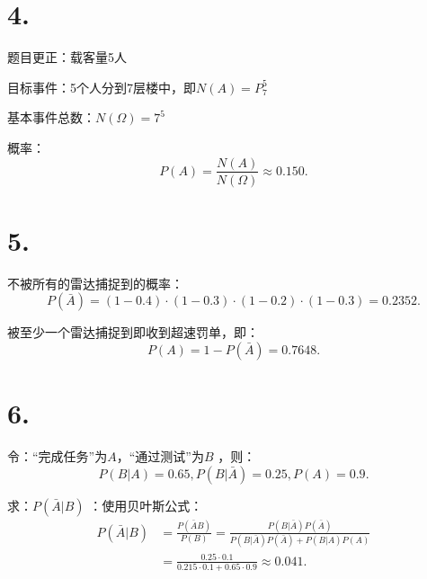 \section*{4. }%
\label{sec:4. }
题目更正：载客量5人

目标事件：5个人分到7层楼中，即$N\left( A \right) =P_{7}^{5}$

基本事件总数：$N\left( \Omega \right) =7^5$

概率： \[
    P\left( A \right) =\frac{N\left( A \right) }{N\left( \Omega \right) }\approx 0.150
.\] 

\section*{5. }%
\label{sec:5. }
不被所有的雷达捕捉到的概率：
\[
    P\left( \bar{A} \right) =\left( 1-0.4 \right) \cdot \left( 1-0.3 \right) \cdot \left( 1-0.2 \right) \cdot \left( 1-0.3 \right) =0.2352
.\] 

被至少一个雷达捕捉到即收到超速罚单，即：
\[
    P\left( A \right) =1-P\left( \bar{A} \right) =0.7648
.\] 
\section*{6. }%
\label{sec:6. }
令：“完成任务”为$A$，“通过测试”为$B$ ，则：\[
    P\left( B|A \right) =0.65,P\left( B|\bar{A} \right) =0.25,P\left( A \right) =0.9
.\] 

求：$P\left( \bar{A}|B \right) $ ：使用贝叶斯公式：
\begin{align*}
    P\left( \bar{A}|B \right) &=\frac{P\left( \bar{A}B \right) }{P\left( B \right) } =\frac{P\left( B|\bar{A} \right) P\left( \bar{A} \right) }{P\left( B|\bar{A} \right)P\left( \bar{A} \right) +P\left( B|A \right) P\left( A \right)  }\\
                              &=\frac{0.25\cdot 0.1}{0.215\cdot 0.1+0.65\cdot 0.9}\approx 0.041
.\end{align*}

